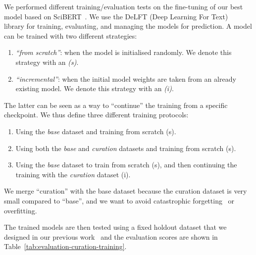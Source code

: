 \documentclass[a4paper]{article}
\begin{document}
We performed different training/evaluation tests on the fine-tuning of our best model based on SciBERT~\cite{Beltagy2019SciBERT}. 
We use the DeLFT (Deep Learning For Text)~\cite{DeLFT} library for training, evaluating, and managing the models for prediction.  A model can be trained with two different strategies: 
\begin{enumerate}
    \item \emph{``from scratch''}: when the model is initialised randomly. We denote this strategy with an \emph{(s)}.
    \item \emph{``incremental''}: when the initial model weights are taken from an already existing model. We denote this strategy with an \emph{(i)}.
\end{enumerate}
The latter can be seen as a way to ``continue'' the training from a specific checkpoint. We thus define three different training protocols: 
\begin{enumerate}
    \item Using the \emph{base} dataset and training from scratch (s).
    \item Using both the \emph{base} and \emph{curation} datasets and training from scratch (s).
    \item Using the \emph{base} dataset to train from scratch (s), and then continuing the training with the \emph{curation} dataset (i).
\end{enumerate}
We merge ``curation'' with the base dataset because the curation dataset is very small compared to ``base'', and we want to avoid catastrophic forgetting~\cite{overcoming-kirkpatrick-etal-2016} or overfitting.

The trained models are then tested using a fixed holdout dataset that we designed in our previous work~\cite{lfoppiano2023automatic} and the evaluation scores are shown in Table~\ref{tab:evaluation-curation-training}.
\end{document}
